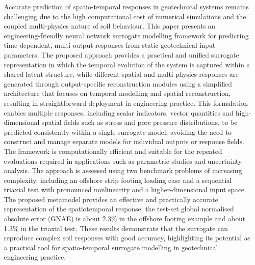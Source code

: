 Accurate prediction of spatio-temporal responses in geotechnical systems remains challenging due to the high computational cost of numerical simulations and the coupled multi-physics nature of soil behaviour. This paper presents an engineering-friendly neural network surrogate modelling framework for predicting time-dependent, multi-output responses from static geotechnical input parameters. The proposed approach provides a practical and unified surrogate representation in which the temporal evolution of the system is captured within a shared latent structure, while different spatial and multi-physics responses are generated through output-specific reconstruction modules using a simplified architecture that focuses on temporal modelling and spatial reconstruction, resulting in straightforward deployment in engineering practice. This formulation enables multiple responses, including scalar indicators, vector quantities and high-dimensional spatial fields such as stress and pore pressure distributions, to be predicted consistently within a single surrogate model, avoiding the need to construct and manage separate models for individual outputs or response fields. The framework is computationally efficient and suitable for the repeated evaluations required in applications such as parametric studies and uncertainty analysis. The approach is assessed using two benchmark problems of increasing complexity, including an offshore strip footing loading case and a sequential triaxial test with pronounced nonlinearity and a higher-dimensional input space. The proposed metamodel provides an effective and practically accurate representation of the spatiotemporal response: the test-set global normalised absolute error (GNAE) is about 2.3\% in the offshore footing example and about 1.3\% in the triaxial test. These results demonstrate that the surrogate can reproduce complex soil responses with good accuracy, highlighting its potential as a practical tool for spatio-temporal surrogate modelling in geotechnical engineering practice.







